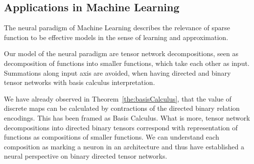 \subsection{Applications in Machine Learning}

The neural paradigm of Machine Learning describes the relevance of sparse function to be effective models in the sense of learning and approximation.

Our model of the neural paradigm are tensor network decompositions, seen as decomposition of functions into smaller functions, which take each other as input.
Summations along input axis are avoided, when having directed and binary tensor networks with basis calculus interpretation.

We have already observed in Theorem~\ref{the:basisCalculus}, that the value of discrete maps can be calculated by contractions of the directed binary relation encodings.
This has been framed as Basis Calculus.
What is more, tensor network decompositions into directed binary tensors correspond with representation of functions as compositions of smaller functions.
We can understand each composition as marking a neuron in an architecture and thus have established a neural perspective on binary directed tensor networks.
